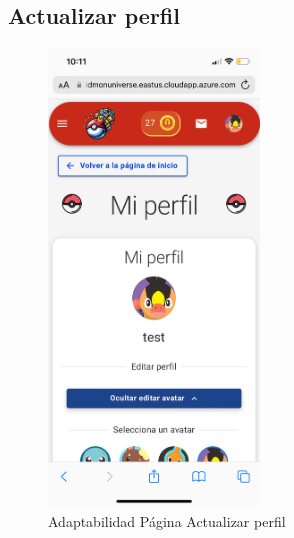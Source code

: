 \subsection*{Actualizar perfil}
\begin{figure}[H]
    \centering
    \includegraphics[width=0.5\textwidth]{figures/adaptabilidad/perfil.png}
    \caption{Adaptabilidad Página Actualizar perfil}
    \label{fig:Adap-Actualizar-Perfil}
\end{figure}


